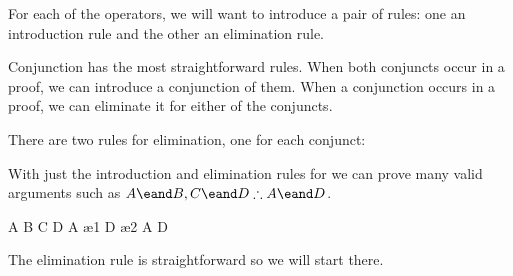For each of the operators, we will want to introduce a pair of rules: one an
introduction rule and the other an elimination rule.

Conjunction has the most straightforward rules. When both conjuncts occur in a
proof, we can introduce a conjunction of them. When a conjunction occurs in a
proof, we can eliminate it for either of the conjuncts.

\begin{fitchrule}
  \label{def:and-introduction-rule}
  \leavevmode
  \vspace{-0.9\baselineskip}
  \begin{fitchproof}
     {\ephi}
     {\epsi}
     {\ephi\eand\epsi} 
  \end{fitchproof}
\end{fitchrule}

\begin{fitchrule}
  \label{def:and-introduction-rule}
  \leavevmode
  There are two rules for \eand elimination, one for each conjunct: \\
\end{fitchrule}

With just the introduction and elimination rules for \eand we can prove many
valid arguments such as $A \eand B, C \eand D \therefore A \eand D$.

\begin{fitchproof}
   {A \eand B} 
   {C \eand D} 
   {A}         \ae{1}
   {D}         \ae{2}
   {A \eand D} 
\end{fitchproof}

The elimination rule is straightforward so we will start there.

\begin{fitchrule}
  \label{def:if-elimination-rule}
  \leavevmode
  \vspace{-0.9\baselineskip}
  \begin{fitchproof}
     {\ephi\eif\epsi}
     {\ephi}
     {\epsi}           
  \end{fitchproof}
\end{fitchrule}

